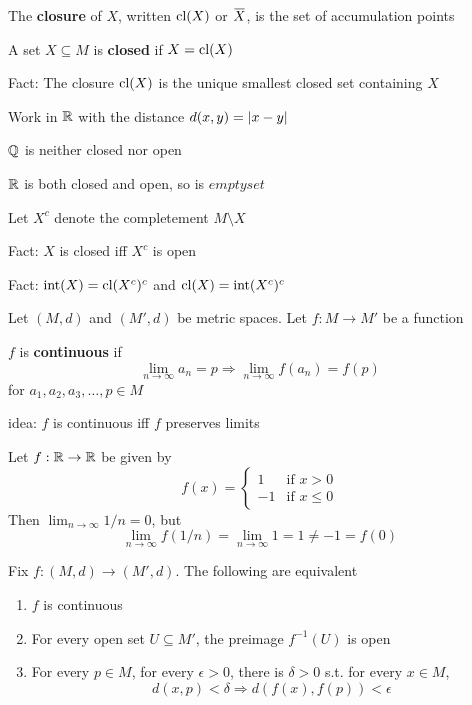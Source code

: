 \documentclass[11pt]{article}
\def \tint {\text{int}}
\begin{document}
\begin{definition}[]
The \textbf{closure} of \(X\), written \(\operatorname{\text{cl}}(X)\) or \(\barX\), is the set of accumulation points
\end{definition}

\begin{definition}[]
A set \(X\subseteq M\) is \textbf{closed} if \(X=\operatorname{\text{cl}}(X)\)
\end{definition}


Fact: The closure \(\operatorname{\text{cl}}(X)\) is the unique smallest closed set containing \(X\)

\begin{examplle}[]
Work in \(\mathbb{R}\) with the distance \(d(x,y)=\abs{x-y}\)

\(\mathbb{Q}\) is neither closed nor open

\(\mathbb{R}\) is both closed and open, so is \(emptyset\)
\end{examplle}

Let \(X^c\) denote the completement \(M\setminus X\)

Fact: \(X\) is closed iff \(X^c\) is open

Fact: \(\tint(X)=\cl(X^c)^c\) and \(\cl(X)=\tint(X^c)^c\)

Let \((M,d)\) and \((M',d)\) be metric spaces. Let \(f:M\to M'\) be a function
\begin{definition}[]
\(f\) is \textbf{continuous} if
\begin{equation*}
\lim_{n\to\infty}a_n=p\Rightarrow\lim_{n\to\infty}f(a_n)=f(p)
\end{equation*}
for \(a_1,a_2,a_3,\dots,p\in M\)
\end{definition}

idea: \(f\) is continuous iff \(f\) preserves limits

\begin{examplle}[]
Let \(f:\mathbb{R}\to\mathbb{R}\) be given by
\begin{equation*}
f(x)=
\begin{cases}
1&\text{if }x>0\\
-1&\text{if }x\le 0
\end{cases}
\end{equation*}
Then \(\lim_{n\to\infty}1/n=0\), but
\begin{equation*}
\lim_{n\to\infty}f(1/n)=\lim_{n\to\infty}1=1\neq-1=f(0)
\end{equation*}
\end{examplle}

\begin{proposition}[]
Fix \(f:(M,d)\to(M',d)\). The following are equivalent
\begin{enumerate}
\item \(f\) is continuous
\item For every open set \(U\subseteq M'\), the preimage \(f^{-1}(U)\) is open
\item For every \(p\in M\), for every \(\epsilon>0\), there is \(\delta>0\) s.t. for every \(x\in M\),
 \begin{equation*}
d(x,p)<\delta\Rightarrow d(f(x),f(p))<\epsilon
 \end{equation*}
\end{enumerate}
\end{proposition}
\end{document}
